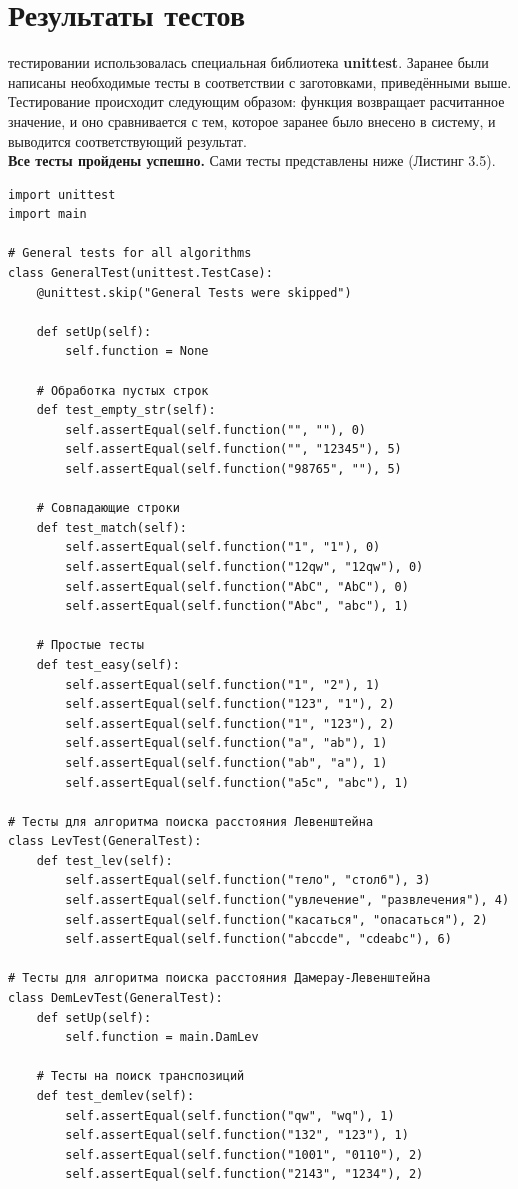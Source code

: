 \documentclass[12pt]{report}
\begin{document}
\section{Результаты тестов}
 тестировании использовалась специальная библиотека \textbf{unittest}. Заранее были написаны необходимые тесты в соответствии с заготовками, приведёнными выше. Тестирование происходит следующим образом: функция возвращает расчитанное значение, и оно сравнивается с тем, которое заранее было внесено в систему, и выводится соответствующий результат.\\

\textbf{Все тесты пройдены успешно.}
Сами тесты представлены ниже (Листинг 3.5).
\begin{lstlisting}[label=some-code, caption = Тесты]
import unittest
import main
	
# General tests for all algorithms
class GeneralTest(unittest.TestCase):
	@unittest.skip("General Tests were skipped")
	
	def setUp(self):
		self.function = None
	
	# Обработка пустых строк
	def test_empty_str(self):
		self.assertEqual(self.function("", ""), 0)
		self.assertEqual(self.function("", "12345"), 5)
		self.assertEqual(self.function("98765", ""), 5)
	
    # Совпадающие строки
	def test_match(self):
		self.assertEqual(self.function("1", "1"), 0)
		self.assertEqual(self.function("12qw", "12qw"), 0)
		self.assertEqual(self.function("AbC", "AbC"), 0)
		self.assertEqual(self.function("Abc", "abc"), 1)
	
	# Простые тесты
	def test_easy(self):
		self.assertEqual(self.function("1", "2"), 1)
		self.assertEqual(self.function("123", "1"), 2)
		self.assertEqual(self.function("1", "123"), 2)
		self.assertEqual(self.function("a", "ab"), 1)
		self.assertEqual(self.function("ab", "a"), 1)
		self.assertEqual(self.function("a5c", "abc"), 1)
	
# Тесты для алгоритма поиска расстояния Левенштейна
class LevTest(GeneralTest):
	def test_lev(self):
		self.assertEqual(self.function("тело", "столб"), 3)
		self.assertEqual(self.function("увлечение", "развлечения"), 4)
		self.assertEqual(self.function("касаться", "опасаться"), 2)
		self.assertEqual(self.function("abccde", "cdeabc"), 6)
	
# Тесты для алгоритма поиска расстояния Дамерау-Левенштейна
class DemLevTest(GeneralTest):
	def setUp(self):
		self.function = main.DamLev
	
	# Тесты на поиск транспозиций
	def test_demlev(self):
		self.assertEqual(self.function("qw", "wq"), 1)
		self.assertEqual(self.function("132", "123"), 1)
		self.assertEqual(self.function("1001", "0110"), 2)
		self.assertEqual(self.function("2143", "1234"), 2)
	

\end{lstlisting}
\end{document}
